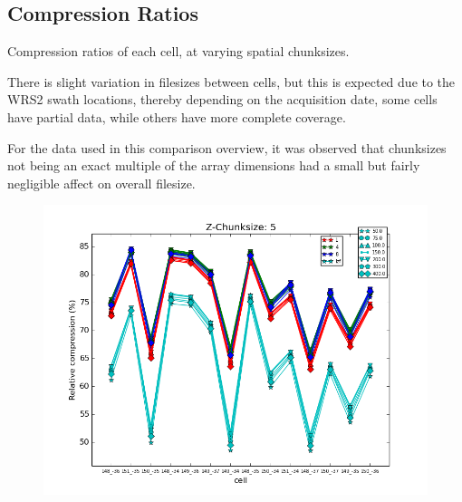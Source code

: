 \documentclass[a4paper]{article}
\begin{document}
    \subsection{Compression Ratios}

      Compression ratios of each cell, at varying spatial chunksizes.
    
      \begin{flushleft}
      There is slight variation in filesizes between cells, but this is expected due to the WRS2 swath locations, thereby depending on the acquisition date, some cells have partial data, while others have more complete coverage. \par
      For the data used in this comparison overview, it was observed that chunksizes not being an exact multiple of the array dimensions had a small but fairly negligible affect on overall filesize.
      \end{flushleft}

      \begin{figure}[h!]
        \centering
        \includegraphics[scale=0.5]{Compression-ratio-per-cell-z_chunk-5.png}
      \end{figure}
    
\end{document}
